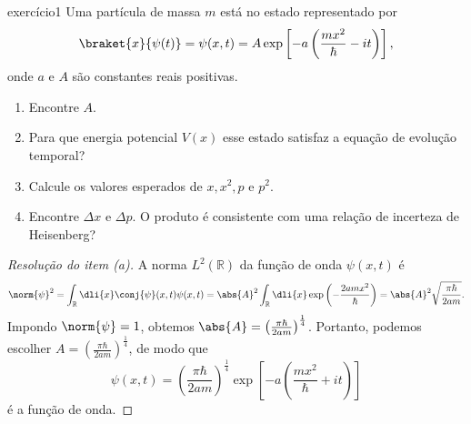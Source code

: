 \begin{exercício}{}{exercício1}
    Uma partícula de massa \(m\) está no estado representado por
    \begin{equation*}
        \braket{x}{\psi(t)} = \psi(x,t) = A\exp\left[-a\left(\frac{mx^2}{\hbar} - it\right)\right],
    \end{equation*}
    onde \(a\) e \(A\) são constantes reais positivas.
    \begin{enumerate}[label=(\alph*)]
        \item Encontre \(A\).
        \item Para que energia potencial \(V(x)\) esse estado satisfaz a equação de evolução temporal?
        \item Calcule os valores esperados de \(x, x^2, p\) e \(p^2\).
        \item Encontre \(\Delta x\) e \(\Delta p\). O produto é consistente com uma relação de incerteza de Heisenberg?
    \end{enumerate}
\end{exercício}
\begin{proof}[Resolução do item (a)]
    A norma \(L^2(\mathbb{R})\) da função de onda \(\psi(x, t)\) é
    \begin{equation*}
        \norm{\psi}^2 = \int_{\mathbb{R}} \dli{x} \conj{\psi}(x,t)\psi(x,t) =\abs{A}^2 \int_{\mathbb{R}} \dli{x} \exp\left(-\frac{2amx^2}{\hbar}\right) = \abs{A}^2 \sqrt{\frac{\pi \hbar}{2 a m}}.
    \end{equation*}
    Impondo \(\norm{\psi} = 1\), obtemos \(\abs{A} = \left(\frac{\pi\hbar}{2 am}\right)^{\frac14}\). Portanto, podemos escolher \(A = \left(\frac{\pi\hbar}{2 am}\right)^{\frac14}\), de modo que
    \begin{equation*}
        \psi(x,t) = \left(\frac{\pi\hbar}{2 am}\right)^{\frac14} \exp\left[-a\left(\frac{mx^2}{\hbar} + it\right)\right]
    \end{equation*}
    é a função de onda.
\end{proof}
